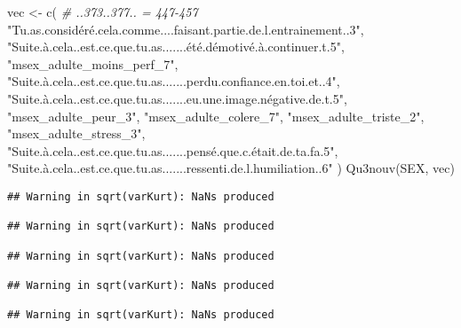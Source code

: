 \documentclass[
]{article}
\newenvironment{Shaded}{\begin{snugshade}}{\end{snugshade}}
\newcommand{\CommentTok}[1]{\textcolor[rgb]{0.56,0.35,0.01}{\textit{#1}}}
\newcommand{\FunctionTok}[1]{\textcolor[rgb]{0.00,0.00,0.00}{#1}}
\newcommand{\NormalTok}[1]{#1}
\newcommand{\OtherTok}[1]{\textcolor[rgb]{0.56,0.35,0.01}{#1}}
\newcommand{\StringTok}[1]{\textcolor[rgb]{0.31,0.60,0.02}{#1}}
\begin{document}
\begin{Shaded}
\begin{Highlighting}[]
\NormalTok{vec }\OtherTok{\textless{}{-}} \FunctionTok{c}\NormalTok{(  }\CommentTok{\# ..373..377.. = 447{-}457}
  \StringTok{"Tu.as.considéré.cela.comme....faisant.partie.de.l.entrainement..3"}\NormalTok{,}
  \StringTok{"Suite.à.cela..est.ce.que.tu.as.......été.démotivé.à.continuer.t.5"}\NormalTok{,}
  \StringTok{"msex\_adulte\_moins\_perf\_7"}\NormalTok{,}
  \StringTok{"Suite.à.cela..est.ce.que.tu.as.......perdu.confiance.en.toi.et..4"}\NormalTok{,}
  \StringTok{"Suite.à.cela..est.ce.que.tu.as.......eu.une.image.négative.de.t.5"}\NormalTok{,}
  \StringTok{"msex\_adulte\_peur\_3"}\NormalTok{,}
  \StringTok{"msex\_adulte\_colere\_7"}\NormalTok{,}
  \StringTok{"msex\_adulte\_triste\_2"}\NormalTok{,}
  \StringTok{"msex\_adulte\_stress\_3"}\NormalTok{,}
  \StringTok{"Suite.à.cela..est.ce.que.tu.as.......pensé.que.c.était.de.ta.fa.5"}\NormalTok{,}
  \StringTok{"Suite.à.cela..est.ce.que.tu.as.......ressenti.de.l.humiliation..6"}
\NormalTok{)}
\FunctionTok{Qu3nouv}\NormalTok{(SEX, vec)}
\end{Highlighting}
\end{Shaded}

\begin{verbatim}
## Warning in sqrt(varKurt): NaNs produced

## Warning in sqrt(varKurt): NaNs produced

## Warning in sqrt(varKurt): NaNs produced

## Warning in sqrt(varKurt): NaNs produced

## Warning in sqrt(varKurt): NaNs produced
\end{verbatim}
\end{document}
